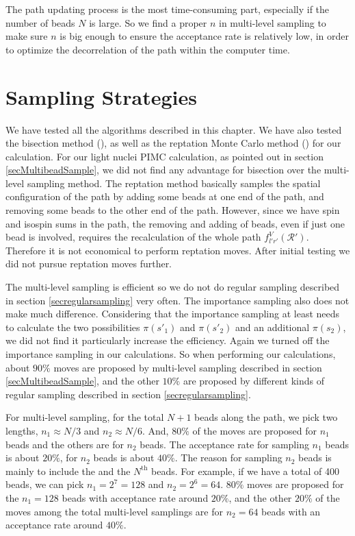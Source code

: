 \documentclass[12pt,letterpaper,UTF8]{report}
\begin{document}
The path updating process is the most time-consuming part, especially if the number of beads $N$ is large.
So we find a proper $n$ in multi-level sampling to make sure $n$ is big enough to ensure the acceptance rate is relatively low,
in order to optimize the decorrelation of the path within the computer time.




\section{Sampling Strategies}
\label{secSampStrat}

We have tested all the algorithms described in this chapter.
We have also tested the bisection method (\cite{Ceperley95a}), as well as the reptation Monte Carlo method (\cite{Baroni99a,Baroni10a}) for our calculation.
For our light nuclei PIMC calculation, as pointed out in section  \ref{secMultibeadSample}, we did not find any advantage for bisection over the multi-level sampling method.
The reptation method basically samples the spatial configuration of the path by adding some beads at one end of the path,
and removing some beads to the other end of the path.
However, since we have spin and isospin sums in the path, the removing and adding of beads, even if just one bead is involved, requires the recalculation of the whole path $f^V_{l'r'}(\mathcal{R}')$.
Therefore it is not economical to perform reptation moves.
After initial testing we did not pursue reptation moves further.


The multi-level sampling is efficient so we do not do regular sampling described in section \ref{secregularsampling} very often.
The importance sampling also does not make much difference.
Considering that the importance sampling at least needs to calculate the two possibilities $\pi(s'_1)$ and $\pi(s'_2)$ and an additional $\pi(s_2)$, we did not find it particularly increase the efficiency. Again we turned off the importance sampling in our calculations.
So when performing our calculations, about $90\%$ moves are proposed by multi-level sampling described in section \ref{secMultibeadSample}, and the other $10\%$ are proposed by different kinds of regular sampling described in section \ref{secregularsampling}.

For multi-level sampling, for the total $N+1$ beads along the path, we pick two lengths, $n_1 \approx N/3$ and $n_2 \approx N/6$.
And, $80\%$ of the moves are proposed for $n_1$ beads and the others are for $n_2$ beads.
The acceptance rate for sampling $n_1$ beads is about $20\%$, for $n_2$ beads is about $40\%$.
The reason for sampling $n_2$ beads is mainly to include the  and the $N^{\text{th}}$ beads.
For example, if we have a total of 400 beads, we can pick $n_1=2^7=128$ and $n_2=2^6=64$. $80\%$ moves are proposed for the $n_1=128$ beads with acceptance rate around $20\%$,
and the other $20\%$ of the moves among the total multi-level samplings are for $n_2=64$ beads with an acceptance rate around $40\%$.
\end{document}
